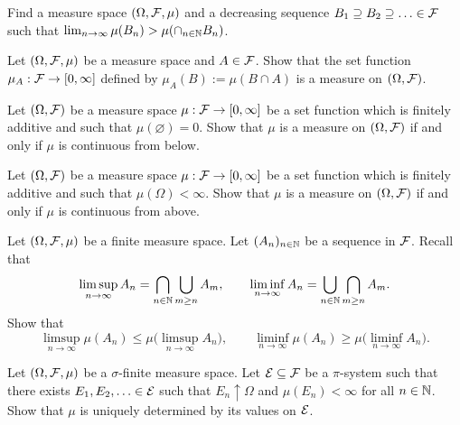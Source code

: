 \begin{problem}
Find a measure space $(\Omega,\mathcal F,\mu)$ and a decreasing sequence $B_1\supseteq B_2\supseteq\ldots \in \mathcal F$ such that $\lim_{n\to\infty}\mu(B_n) > \mu(\cap_{n\in \mathbb N} B_n)$.    
\end{problem}

\begin{problem}
    Let $(\Omega,\mathcal F,\mu)$ be a measure space and $A\in \mathcal F$. Show that the set function $\mu_A:\mathcal F\to[0,\infty]$ defined by $\mu_A(B):=\mu(B\cap A)$ is a measure on $(\Omega,\mathcal F)$.  
\end{problem}

\begin{problem}
    Let $(\Omega,\mathcal F)$ be a measure space $\mu:\mathcal F\to[0,\infty]$ be a set function which is finitely additive and such that $\mu(\varnothing)=0$. Show that $\mu$ is a measure on $(\Omega,\mathcal F)$ if and only if $\mu$ is continuous from below. 
\end{problem}

\begin{problem}
    Let $(\Omega,\mathcal F)$ be a measure space $\mu:\mathcal F\to[0,\infty]$ be a set function which is finitely additive and such that $\mu(\Omega)<\infty$. Show that $\mu$ is a measure on $(\Omega,\mathcal F)$ if and only if $\mu$ is continuous from above. 
\end{problem}


\begin{problem}
    Let $(\Omega,\mathcal F,\mu)$ be a finite measure space. Let $(A_n)_{n\in \mathbb N}$ be a sequence in $\mathcal F$. Recall that 
    \begin{equation*}
        \limsup_{n\to\infty} A_n = \bigcap_{n\in \mathbb N} \bigcup_{m\geq n} A_m,\qquad \liminf_{n\to\infty} A_n = \bigcup_{n\in \mathbb N} \bigcap_{m\geq n} A_m.
    \end{equation*} 
    Show that
    \begin{equation*}
        \limsup_{n\to\infty} \mu(A_n) \leq  \mu \Big(\limsup_{n\to\infty} A_n\Big),\qquad \liminf_{n\to\infty} \mu(A_n) \geq  \mu \Big(\liminf_{n\to\infty} A_n\Big).
    \end{equation*}
\end{problem}

\begin{problem}
    Let $(\Omega,\mathcal F,\mu)$ be a $\sigma$-finite measure space. Let $\mathcal E\subseteq \mathcal F$ be a $\pi$-system such that there exists $E_1,E_2,\ldots \in \mathcal E$ such that $E_n\uparrow \Omega$ and $\mu(E_n)<\infty$ for all $n\in \mathbb N$. Show that $\mu$ is uniquely determined by its values on $\mathcal E$.
\end{problem}

